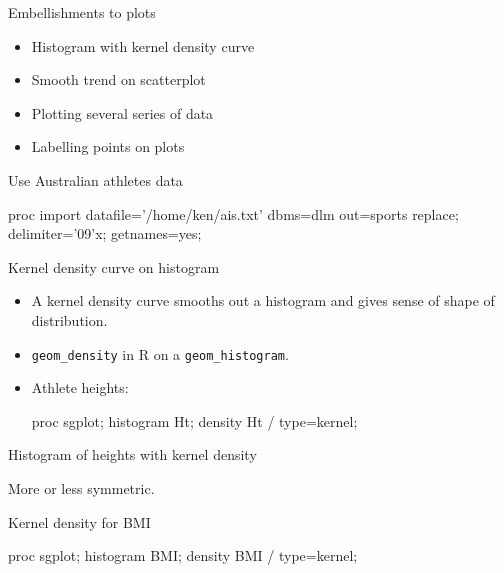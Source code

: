 \documentclass[unknownkeysallowed]{beamer}\usepackage[]{graphicx}\usepackage[]{color}
\begin{document}
\begin{frame}[fragile]{Embellishments to plots}
  
  \begin{itemize}
  \item Histogram with kernel density curve
  \item Smooth trend on scatterplot
  \item Plotting several series of data
  \item Labelling points on plots
  \end{itemize}
  
\end{frame}

\begin{frame}[fragile]{Use Australian athletes data}
  
    \begin{Datastep}
proc import 
  datafile='/home/ken/ais.txt'
  dbms=dlm
  out=sports
  replace;
  delimiter='09'x;
  getnames=yes;
    \end{Datastep}
  
  
\end{frame}


\begin{frame}[fragile]{Kernel density curve on histogram}

  \begin{itemize}
  \item A kernel density curve smooths out a histogram and gives sense
    of shape of distribution.
  \item \texttt{geom\_density} in R on a \texttt{geom\_histogram}.
  \item Athlete heights:
\begin{Sascode}[store=mix]
proc sgplot;
  histogram Ht;
  density Ht / type=kernel;
\end{Sascode}

  \end{itemize}
  
\end{frame}

\begin{frame}[fragile]{Histogram of heights with kernel density}


More or less symmetric.
  
\end{frame}

\begin{frame}[fragile]{Kernel density for BMI}
  
\begin{Sascode}[store=miy]
proc sgplot;
  histogram BMI;
  density BMI / type=kernel;
\end{Sascode}
  
  
\end{frame}
\end{document}

